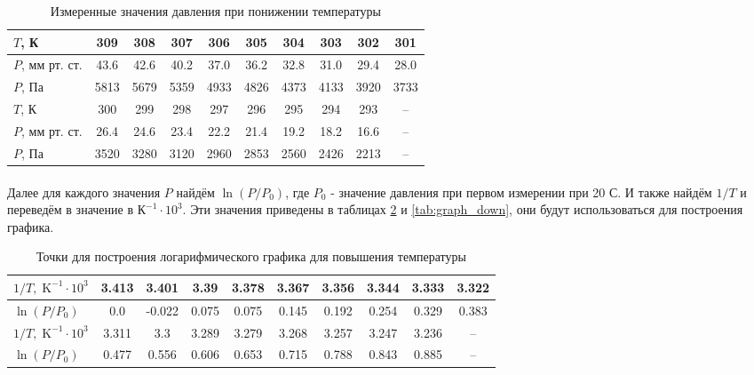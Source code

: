 \documentclass[a4paper,12pt]{article} %
\begin{document}
\begin{table}[h]
\begin{center}
\begin{tabular}{|l|c|c|c|c|c|c|c|c|c|}
\hline 
$T$, К & 309 & 308 & 307 & 306 & 305 & 304 & 303 & 302 & 301 \\ 
\hline 
$P$, мм рт. ст. & 43.6 & 42.6 & 40.2 & 37.0 & 36.2 & 32.8 & 31.0 & 29.4 & 28.0 \\ 
\hline
$P$, Па & 5813 & 5679 & 5359 & 4933 & 4826 & 4373 & 4133 & 3920 & 3733 \\
\hline 
\hline
$T$, К & 300 & 299 & 298 & 297 & 296 & 295 & 294 & 293 & -- \\ 
\hline 
$P$, мм рт. ст. & 26.4 & 24.6 & 23.4 & 22.2 & 21.4 & 19.2 & 18.2 & 16.6 & -- \\ 
\hline 
$P$, Па & 3520 & 3280 & 3120 & 2960 & 2853 & 2560 & 2426 & 2213 & -- \\
\hline 
\end{tabular} 
\end{center}
\caption{Измеренные значения давления при понижении температуры}
\label{tab:data_down}
\end{table}

\paragraph{}
Далее для каждого значения $P$ найдём $\ln(P/P_0)$, где $P_0$ - значение давления при первом измерении при 20 \degree С. И также найдём $1/T$ и переведём в значение в $\text{К}^{-1} \cdot 10^3$. Эти значения приведены в таблицах \ref{tab:graph_up} и \ref{tab:graph_down}, они будут использоваться для построения графика.

\begin{table}[h]
\begin{center}
\begin{tabular}{|l|c|c|c|c|c|c|c|c|c|}
\hline 
$1/T, \; \text{K}^{-1} \cdot 10^3$ & 3.413 & 3.401 & 3.39 & 3.378 & 3.367 & 3.356 & 3.344 & 3.333 & 3.322 \\ 
\hline 
$\ln(P/P_0)$ & 0.0 & -0.022 & 0.075 & 0.075 & 0.145 & 0.192 & 0.254 & 0.329 & 0.383 \\
\hline 
\hline
$1/T, \; \text{K}^{-1} \cdot 10^3$ &  3.311 & 3.3 & 3.289 & 3.279 & 3.268 & 3.257 & 3.247 & 3.236 & -- \\ 
\hline 
$\ln(P/P_0)$ &  0.477 & 0.556 & 0.606 & 0.653 & 0.715 & 0.788 & 0.843 & 0.885 & -- \\
\hline 
\end{tabular} 
\end{center}
\caption{Точки для построения логарифмического графика для повышения температуры}
\label{tab:graph_up}
\end{table}
\end{document}
